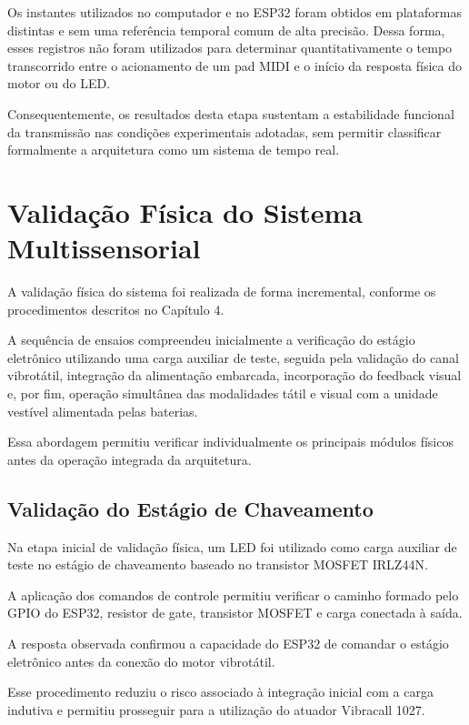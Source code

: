 Os instantes utilizados no computador e no ESP32 foram obtidos em plataformas distintas e sem uma referência temporal comum de alta precisão. Dessa forma, esses registros não foram utilizados para determinar quantitativamente o tempo transcorrido entre o acionamento de um pad MIDI e o início da resposta física do motor ou do LED.

Consequentemente, os resultados desta etapa sustentam a estabilidade funcional da transmissão nas condições experimentais adotadas, sem permitir classificar formalmente a arquitetura como um sistema de tempo real.

\section{Validação Física do Sistema Multissensorial}

A validação física do sistema foi realizada de forma incremental, conforme os procedimentos descritos no Capítulo 4.

A sequência de ensaios compreendeu inicialmente a verificação do estágio eletrônico utilizando uma carga auxiliar de teste, seguida pela validação do canal vibrotátil, integração da alimentação embarcada, incorporação do feedback visual e, por fim, operação simultânea das modalidades tátil e visual com a unidade vestível alimentada pelas baterias.

Essa abordagem permitiu verificar individualmente os principais módulos físicos antes da operação integrada da arquitetura.


\subsection{Validação do Estágio de Chaveamento}

Na etapa inicial de validação física, um LED foi utilizado como carga auxiliar de teste no estágio de chaveamento baseado no transistor MOSFET IRLZ44N.

A aplicação dos comandos de controle permitiu verificar o caminho formado pelo GPIO do ESP32, resistor de gate, transistor MOSFET e carga conectada à saída.

A resposta observada confirmou a capacidade do ESP32 de comandar o estágio eletrônico antes da conexão do motor vibrotátil.

Esse procedimento reduziu o risco associado à integração inicial com a carga indutiva e permitiu prosseguir para a utilização do atuador Vibracall 1027.

